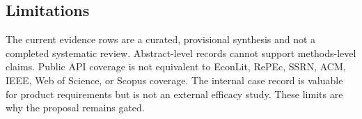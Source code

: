 \documentclass[11pt]{article}
\begin{document}
\hypertarget{limitations}{%
\subsection{Limitations}\label{limitations}}

The current evidence rows are a curated, provisional synthesis and not a completed systematic review. Abstract-level records cannot support methods-level claims. Public API coverage is not equivalent to EconLit, RePEc, SSRN, ACM, IEEE, Web of Science, or Scopus coverage. The internal case record is valuable for product requirements but is not an external efficacy study. These limits are why the proposal remains gated.
\end{document}

